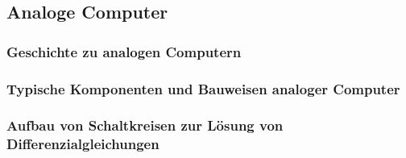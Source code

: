 \subsection{Analoge Computer}

\subsubsection{Geschichte zu analogen Computern}

\subsubsection{Typische Komponenten und Bauweisen analoger Computer}

\subsubsection{Aufbau von Schaltkreisen zur Lösung von Differenzialgleichungen}
